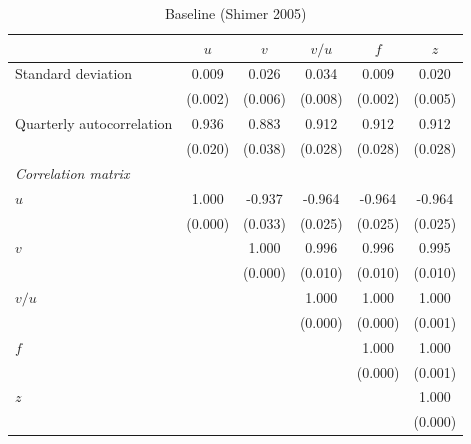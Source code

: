 \begin{table}[ht]
\centering
\caption{Baseline (Shimer 2005)}
\label{tab:baseline}
\begin{tabular}{lccccc}
\toprule
 & $u$ & $v$ & $v/u$ & $f$ & $z$ \\
\midrule
Standard deviation & 0.009 & 0.026 & 0.034 & 0.009 & 0.020 \\
 & (0.002) & (0.006) & (0.008) & (0.002) & (0.005) \\
\addlinespace
Quarterly autocorrelation & 0.936 & 0.883 & 0.912 & 0.912 & 0.912 \\
 & (0.020) & (0.038) & (0.028) & (0.028) & (0.028) \\
\midrule
\multicolumn{6}{l}{\textit{Correlation matrix}} \\
\addlinespace
$u$ & 1.000 & -0.937 & -0.964 & -0.964 & -0.964 \\
 & (0.000) & (0.033) & (0.025) & (0.025) & (0.025) \\
\addlinespace
$v$ &  & 1.000 & 0.996 & 0.996 & 0.995 \\
 &  & (0.000) & (0.010) & (0.010) & (0.010) \\
\addlinespace
$v/u$ &  &  & 1.000 & 1.000 & 1.000 \\
 &  &  & (0.000) & (0.000) & (0.001) \\
\addlinespace
$f$ &  &  &  & 1.000 & 1.000 \\
 &  &  &  & (0.000) & (0.001) \\
\addlinespace
$z$ &  &  &  &  & 1.000 \\
 &  &  &  &  & (0.000) \\
\bottomrule
\end{tabular}
\end{table}
